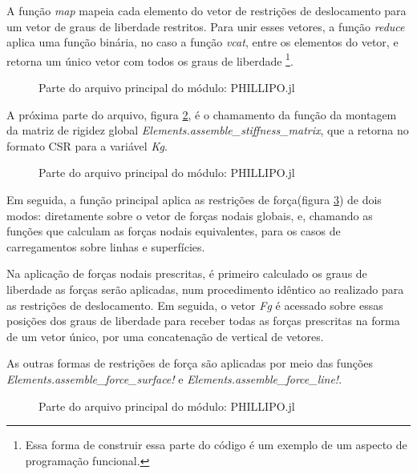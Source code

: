 A função \emph{map} mapeia cada elemento do vetor de restrições de deslocamento para um vetor de graus de liberdade restritos. Para unir esses vetores, a função \emph{reduce} aplica uma função binária, no caso a função \emph{vcat}, entre os elementos do vetor, e retorna um único vetor com todos os graus de liberdade \footnote{Essa forma de construir essa parte do código é um exemplo de um aspecto de programação funcional.}. 

\begin{figure}[hbtp]
    \caption{Parte do arquivo principal do módulo: PHILLIPO.jl}
    
    \label{fig:phillipo.jl_3}
\end{figure}

A próxima parte do arquivo, figura \ref{fig:phillipo.jl_4}, é o chamamento da função da montagem da matriz de rigidez global \emph{Elements.assemble\_stiffness\_matrix}, que a retorna no formato CSR para a variável \emph{Kg}. 

\begin{figure}[hbtp]
    \caption{Parte do arquivo principal do módulo: PHILLIPO.jl}
    
    \label{fig:phillipo.jl_4}
\end{figure}

Em seguida, a função principal aplica as restrições de força(figura \ref{fig:phillipo.jl_5}) de dois modos: diretamente sobre o vetor de forças nodais globais, e, chamando as funções que calculam as forças nodais equivalentes, para os casos de carregamentos sobre linhas e superfícies.

Na aplicação de forças nodais prescritas, é primeiro calculado os graus de liberdade as forças serão aplicadas, num procedimento idêntico ao realizado para as restrições de deslocamento. Em seguida, o vetor \emph{Fg} é acessado sobre essas posições dos graus de liberdade para receber todas as forças prescritas na forma de um vetor único, por uma concatenação de vertical de vetores.

As outras formas de restrições de força são aplicadas por meio das funções \emph{Elements.assemble\_force\_surface!} e \emph{Elements.assemble\_force\_line!}.

\begin{figure}[hbtp]
    \caption{Parte do arquivo principal do módulo: PHILLIPO.jl}
    
    \label{fig:phillipo.jl_5}
\end{figure}

